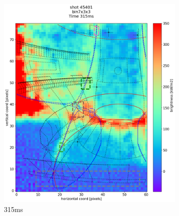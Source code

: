 \begin{figure}[!ht]
     \centering
     \begin{subfigure}{0.355\linewidth}
         \centering
         \includegraphics[trim={50 0 25 80},clip,width=\textwidth]{Chapters/chapter2/figs/IRVB-MASTU_shot-45401_export_63.png}
         \caption{315ms}
         \label{fig:45401_export_1}
     \end{subfigure}
     \begin{subfigure}{0.355\linewidth}
         \centering

\end{subfigure}
\end{figure}
